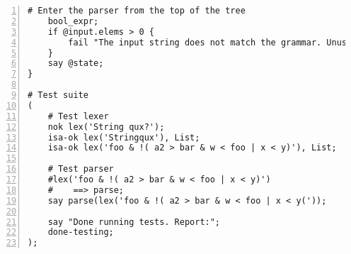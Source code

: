 \documentclass[17pt,english]{extarticle}
\begin{document}
\begin{lstlisting}[numbers=left,basicstyle={\scriptsize\ttfamily},extendedchars=true]
    # Enter the parser from the top of the tree
    bool_expr;
    if @input.elems > 0 {
        fail "The input string does not match the grammar. Unused input: " ~ @input
    }
    say @state;
}

# Test suite
(
    # Test lexer
    nok lex('String qux?');
    isa-ok lex('Stringqux'), List;
    isa-ok lex('foo & !( a2 > bar & w < foo | x < y)'), List;

    # Test parser
    #lex('foo & !( a2 > bar & w < foo | x < y)')
    #    ==> parse;
    say parse(lex('foo & !( a2 > bar & w < foo | x < y('));

    say "Done running tests. Report:";
    done-testing;
);
\end{lstlisting}
\end{document}
